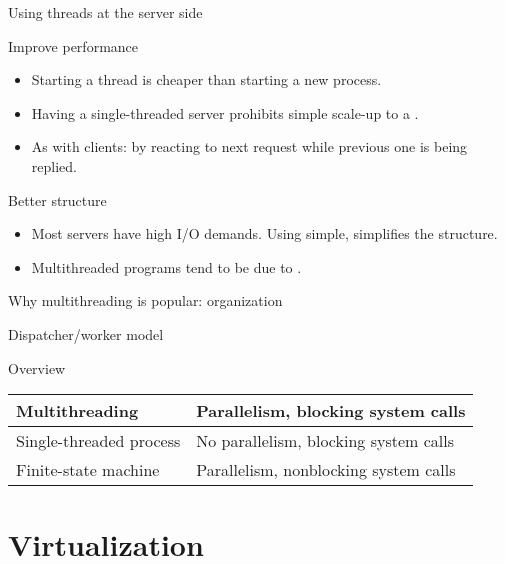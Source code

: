 \begin{slide}{Using threads at the server side}
  \begin{block}{Improve performance}
    \begin{itemize}\tightlist
    \item Starting a thread is cheaper than starting a new process.
    \item Having a single-threaded server prohibits simple scale-up to a .
    \item As with clients:  by reacting to next request while previous one is being replied.
    \end{itemize}
  \end{block}
  \begin{block}{Better structure}
    \begin{itemize}\tightlist
    \item Most servers have high I/O demands. Using simple,  simplifies
      the structure.
    \item Multithreaded programs tend to be  due to .
    \end{itemize}
  \end{block}
\end{slide}
\begin{slide}{Why multithreading is popular: organization}
  \begin{block}{Dispatcher/worker model}
    \begin{center}
    \end{center}
  \end{block}
  \begin{block}{Overview}
    \begin{center}
      \begin{tabular}{|l|l|}\hline
        Multithreading          & Parallelism, blocking system calls \\ \hline
        Single-threaded process & No parallelism, blocking system calls \\ \hline
        Finite-state machine    & Parallelism, nonblocking system calls \\ \hline
      \end{tabular}
    \end{center}
  \end{block}
\end{slide}
\section{Virtualization}
